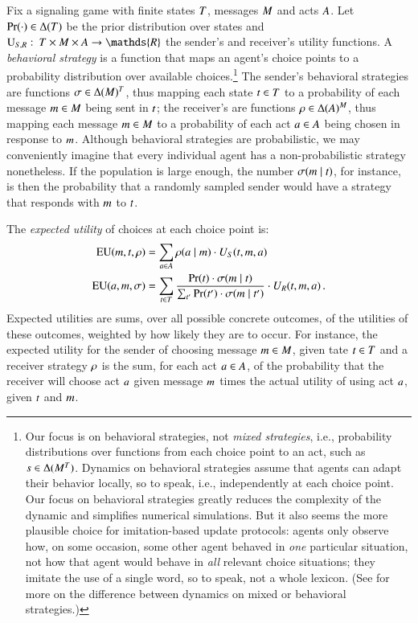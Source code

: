 \documentclass[fleqn,reqno,10pt]{article}
\begin{document}
Fix a signaling game with finite states $T$, messages $M$ and acts $A$. Let
$\Pr(\cdot) \in \Delta(T)$ be the prior distribution over states and
$\Util_{\sen,\rec} \mycolon \States \times \Messgs \times \Acts \rightarrow \mathds{R}$ the
sender's and receiver's utility functions. A \emph{behavioral strategy} is a function that maps
an agent's choice points to a probability distribution over available choices.\footnote{Our
  focus is on behavioral strategies, not \emph{mixed strategies}, i.e., probability
  distributions over functions from each choice point to an act, such as
  $s \in \Delta(M^{T})$.  Dynamics on behavioral strategies assume that agents can
  adapt their behavior locally, so to speak, i.e., independently at each choice point. Our
  focus on behavioral strategies greatly reduces the complexity of the dynamic and simplifies
  numerical simulations. But it also seems the more plausible choice for imitation-based update
  protocols: agents only observe how, on some occasion, some other agent behaved in \emph{one}
  particular situation, not how that agent would behave in \emph{all} relevant choice
  situations; they imitate the use of a single word, so to speak, not a whole lexicon. (See
  \citet{Cressman2003:Evolutionary-Dy} for more on the difference between dynamics on mixed or
  behavioral strategies.)} The sender's behavioral strategies are functions
$\sigma \in \Delta(M)^T$, thus mapping each state $t \in T$ to a
probability of each message $m \in M$ being sent in $t$; the receiver's are
functions $\rho \in \Delta(A)^M$, thus mapping each message $m \in M$
to a probability of each act $a \in A$ being chosen in response to $m$. Although
behavioral strategies are probabilistic, we may conveniently imagine that every individual
agent has a non-probabilistic strategy nonetheless. If the population is large enough, the
number $\sigma(m \mid t)$, for instance, is then the probability that a randomly
sampled sender would have a strategy that responds with $m$ to $t$.

The \emph{expected utility} of choices at each choice point is:
\begin{align*}
  \mathrm{EU}(m, t, \rho) & = \sum_{a \in A}
  \rho(a \mid m) \cdot U_S(t, m, a) \\
  \mathrm{EU}(a, m, \sigma) & = \sum_{t \in
    T} \frac{\Pr(t) \cdot \sigma(m \mid t)}{\sum_{t'} \Pr(t') \cdot \sigma(m \mid t')} \cdot
  U_R(t, m, a) \,.
\end{align*}
Expected utilities are sums, over all possible concrete outcomes, of the utilities of these
outcomes, weighted by how likely they are to occur. For instance, the expected utility for the
sender of choosing message $m \in M$, given tate $t \in T$ and a receiver
strategy $\rho$ is the sum, for each act $a \in A$, of the probability that the
receiver will choose act $a$ given message $m$ times the actual utility of using act
$a$, given $t$ and $m$.
\end{document}
